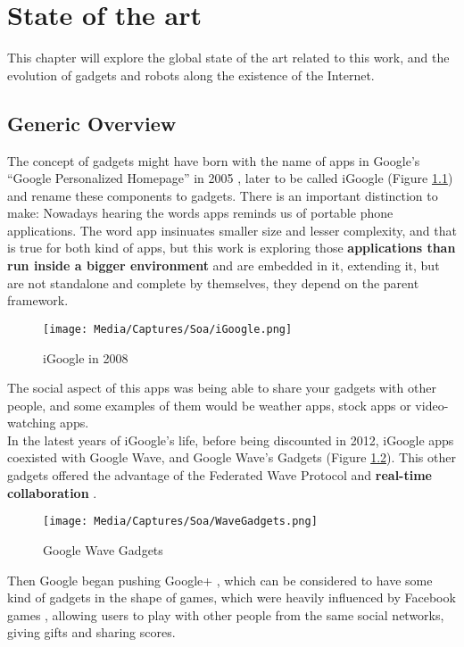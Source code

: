 \newpage
\thispagestyle{sectioned}
\chapter{State of the art}
This chapter will explore the global state of the art related to this work, and the evolution of gadgets and robots along the existence of the Internet.
\section{Generic Overview}
The concept of gadgets might have born with the name of apps in Google's ``Google Personalized Homepage'' in 2005 \cite{ref:what_happened_to_igoogle}, later to be called iGoogle (Figure \ref{fig:igoogle_2008}) and rename these components to gadgets. There is an important distinction to make: Nowadays hearing the words apps reminds us of portable phone applications. The word app insinuates smaller size and lesser complexity, and that is true for both kind of apps, but this work is exploring those \textbf{applications than run inside a bigger environment} and are embedded in it, extending it, but are not standalone and complete by themselves, they depend on the parent framework.
\begin{figure}[h]
  \center
    \texttt{[image: Media/Captures/Soa/iGoogle.png]}
  \caption{iGoogle in 2008}
  \label{fig:igoogle_2008}
\end{figure}
The social aspect of this apps was being able to share your gadgets with other people, and some examples of them would be weather apps, stock apps or video-watching apps.\\[.2cm]
In the latest years of iGoogle's life, before being discounted in 2012, iGoogle apps coexisted with Google Wave, and Google Wave's Gadgets (Figure \ref{fig:wave_gadgets}). This other gadgets offered the advantage of the Federated Wave Protocol \cite{ref:wave_federation_protocol} and \textbf{real-time collaboration} \cite{ref:apache_wave_about}.\\[.2cm]
\begin{figure}[h]
  \center
    \texttt{[image: Media/Captures/Soa/WaveGadgets.png]}
  \caption{Google Wave Gadgets}
  \label{fig:wave_gadgets}
\end{figure}
Then Google began pushing Google+ \cite{ref:google_plus}, which can be considered to have some kind of gadgets in the shape of games, which were heavily influenced by Facebook games \cite{ref:facebook_games}, allowing users to play with other people from the same social networks, giving gifts and sharing scores.\\[.2cm]
